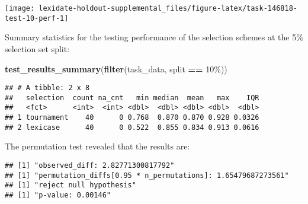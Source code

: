\documentclass[
]{book}
\newenvironment{Shaded}{\begin{snugshade}}{\end{snugshade}}
\newcommand{\AttributeTok}[1]{\textcolor[rgb]{0.13,0.29,0.53}{#1}}
\newcommand{\DecValTok}[1]{\textcolor[rgb]{0.00,0.00,0.81}{#1}}
\newcommand{\FunctionTok}[1]{\textcolor[rgb]{0.13,0.29,0.53}{\textbf{#1}}}
\newcommand{\NormalTok}[1]{#1}
\newcommand{\OtherTok}[1]{\textcolor[rgb]{0.56,0.35,0.01}{#1}}
\newcommand{\SpecialCharTok}[1]{\textcolor[rgb]{0.81,0.36,0.00}{\textbf{#1}}}
\newcommand{\StringTok}[1]{\textcolor[rgb]{0.31,0.60,0.02}{#1}}
\begin{document}
\texttt{[image: lexidate-holdout-supplemental\_files/figure-latex/task-146818-test-10-perf-1]}

Summary statistics for the testing performance of the selection schemes at the 5\% selection set split:

\begin{Shaded}
\begin{Highlighting}[]
\FunctionTok{test\_results\_summary}\NormalTok{(}\FunctionTok{filter}\NormalTok{(task\_data, split }\SpecialCharTok{==} \StringTok{\textquotesingle{}10\%\textquotesingle{}}\NormalTok{))}
\end{Highlighting}
\end{Shaded}

\begin{verbatim}
## # A tibble: 2 x 8
##   selection  count na_cnt   min median  mean   max    IQR
##   <fct>      <int>  <int> <dbl>  <dbl> <dbl> <dbl>  <dbl>
## 1 tournament    40      0 0.768  0.870 0.870 0.928 0.0326
## 2 lexicase      40      0 0.522  0.855 0.834 0.913 0.0616
\end{verbatim}

The permutation test revealed that the results are:

\begin{Shaded}
\end{Shaded}

\begin{verbatim}
## [1] "observed_diff: 2.82771300817792"
## [1] "permutation_diffs[0.95 * n_permutations]: 1.65479687273561"
## [1] "reject null hypothesis"
## [1] "p-value: 0.00146"
\end{verbatim}
\end{document}
